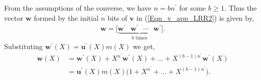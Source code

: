 \documentclass[10pt,journal]{IEEEtran}
\def \deg{{\mathrm{deg}}}
\begin{document}

From the assumptions of the converse, we have $n = bn^{\prime}$ for some $b \geq 1$.
Thus the vector $\mathbf{w}$ formed by the initial $n$ bits of $\mathbf{v}$ in (\ref{Eqn_v_app_LRR2}) is given by,
% 
\begin{align}
% 
\mathbf{w} = \Big[\underbrace{\mathbf{w}^{\prime} \mbox{~~} \mathbf{w}^{\prime} \mbox{~~} \cdots \mbox{~~} \mathbf{w}^{\prime}}_{b \text{ times}}\Big].
\label{Eqn_w_app_LRR11}
% 
\end{align}
% 
Substituting $\mathbf{w}^{\prime}(X) = \mathbf{u}^{\prime}(X) m(X)$ we get, 
% 
\begin{align}
%  
\mathbf{w}(X) &= \mathbf{w}^{\prime}(X) + X^{n^{\prime}}\mathbf{w}^{\prime}(X) + \ldots + X^{(b-1)n^{\prime}}\mathbf{w}^{\prime}(X) \nonumber \\
	      &= \mathbf{u}^{\prime}(X) m(X) \Big( 1+ X^{n^{\prime}} + \ldots + X^{(b-1)n^{\prime}} \Big).
\label{Eqn_num_w_multi_m}	      
% 
\end{align}
% 
\end{document}
